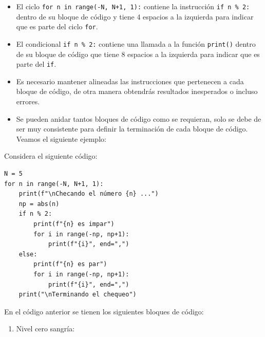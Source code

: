 \documentclass[
  spanish,
  letterpaper,
]{scrbook}
\providecommand{\tightlist}{%
  \setlength{\itemsep}{0pt}\setlength{\parskip}{0pt}}
\theoremstyle{definition}
\theoremstyle{remark}
\newcounter{quartocalloutexmno}
\newcommand{\quartocalloutexm}[1]{\refstepcounter{quartocalloutexmno}\label{#1}}
\begin{document}
\begin{itemize}
\tightlist
\item
  El ciclo \texttt{for\ n\ in\ range(-N,\ N+1,\ 1):} contiene la
  instrucción \texttt{if\ n\ \%\ 2:} dentro de su bloque de código y
  tiene 4 espacios a la izquierda para indicar que es parte del ciclo
  \texttt{for}.
\item
  El condicional \texttt{if\ n\ \%\ 2:} contiene una llamada a la
  función \texttt{print()} dentro de su bloque de código que tiene 8
  espacios a la izquierda para indicar que es parte del \texttt{if}.
\item
  Es necesario mantener alineadas las instrucciones que pertenecen a
  cada bloque de código, de otra manera obtendrás resultados inesperados
  o incluso errores.
\item
  Se pueden anidar tantos bloques de código como se requieran, solo se
  debe de ser muy consistente para definir la terminación de cada bloque
  de código. Veamos el siguiente ejemplo:
\end{itemize}

\begin{tcolorbox}[enhanced jigsaw, colframe=quarto-callout-tip-color-frame, opacityback=0, toprule=.15mm, colback=white, coltitle=black, leftrule=.75mm, arc=.35mm, breakable, left=2mm, bottomtitle=1mm, rightrule=.15mm, bottomrule=.15mm, colbacktitle=quarto-callout-tip-color!10!white, toptitle=1mm, titlerule=0mm, opacitybacktitle=0.6, title={Tip \ref*{exm-h-6}: Sangrías anidadas.}]

\quartocalloutexm{exm-h-6} 

Considera el siguiente código:

\begin{verbatim}
N = 5
for n in range(-N, N+1, 1):
    print(f"\nChecando el número {n} ...")
    np = abs(n)
    if n % 2:
        print(f"{n} es impar")
        for i in range(-np, np+1):
            print(f"{i}", end=",")
    else:
        print(f"{n} es par")
        for i in range(-np, np+1):
            print(f"{i}", end=",")
    print("\nTerminando el chequeo")
\end{verbatim}

\end{tcolorbox}

En el código anterior se tienen los siguientes bloques de código:

\begin{enumerate}
\def\labelenumi{\arabic{enumi}.}
\tightlist
\item
  Nivel cero sangría:
\end{enumerate}
\end{document}
